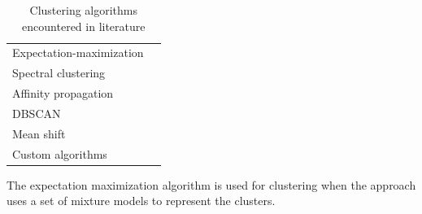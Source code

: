 \begin{table}[h]
\begin{tabular}{p{}p{}}
        Expectation-maximization 			                                & \cite{mixture_gaussian_hmm, moar_mpl_tsc, auto_encoder_many_tsc_algorithms, hier_clust_w_state_space_models} \\
        Spectral clustering 				                                & \cite{temporal_tsc_threshold_ar_models, fragmented_periodogram, auto_encoder_many_tsc_algorithms} \\
        Affinity propagation  				                                & \cite{auto_encoder_many_tsc_algorithms} \\
        DBSCAN  							                                & \cite{auto_encoder_many_tsc_algorithms} \\
        Mean shift  						                                & \cite{auto_encoder_many_tsc_algorithms} \\
        Custom algorithms 					                                & \cite{clust_large_datasets_aghabozorg, multivariate_tsc_common_pca, tensor_multi_elastic_kernel_tsc, var_multivar_tsc, xml_dft_delaunay_traingulation} \\
        \bottomrule
    \end{tabular}
    \caption{Clustering algorithms encountered in literature}
    \label{tab:clust_alg}
\end{table}








The expectation maximization algorithm is used for clustering when the approach uses a set of mixture models to represent the clusters. 
\textcite{hier_clust_w_state_space_models}

